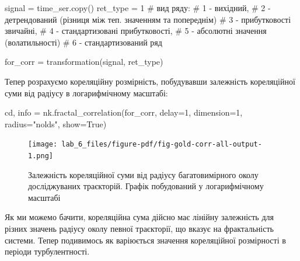 \documentclass[
  letterpaper,
]{report}
\newenvironment{Shaded}{\begin{snugshade}}{\end{snugshade}}
\newcommand{\CommentTok}[1]{\textcolor[rgb]{0.37,0.37,0.37}{#1}}
\newcommand{\DecValTok}[1]{\textcolor[rgb]{0.68,0.00,0.00}{#1}}
\newcommand{\NormalTok}[1]{\textcolor[rgb]{0.00,0.23,0.31}{#1}}
\newcommand{\OperatorTok}[1]{\textcolor[rgb]{0.37,0.37,0.37}{#1}}
\newcommand{\StringTok}[1]{\textcolor[rgb]{0.13,0.47,0.30}{#1}}
\newcommand{\VariableTok}[1]{\textcolor[rgb]{0.07,0.07,0.07}{#1}}
\begin{document}
\begin{Shaded}
\begin{Highlighting}[]
\NormalTok{signal }\OperatorTok{=}\NormalTok{ time\_ser.copy()}
\NormalTok{ret\_type }\OperatorTok{=} \DecValTok{1}    \CommentTok{\# вид ряду: }
                \CommentTok{\# 1 {-} вихідний, }
                \CommentTok{\# 2 {-} детрендований (різниця між теп. значенням та попереднім)}
                \CommentTok{\# 3 {-} прибутковості звичайні, }
                \CommentTok{\# 4 {-} стандартизовані прибутковості, }
                \CommentTok{\# 5 {-} абсолютні значення (волатильності)}
                \CommentTok{\# 6 {-} стандартизований ряд}

\NormalTok{for\_corr }\OperatorTok{=}\NormalTok{ transformation(signal, ret\_type) }
\end{Highlighting}
\end{Shaded}

Тепер розрахуємо кореляційну розмірність, побудувавши залежність
кореляційної суми від радіусу в логарифмічному масштабі:

\begin{Shaded}
\begin{Highlighting}[]
\NormalTok{cd, info }\OperatorTok{=}\NormalTok{ nk.fractal\_correlation(for\_corr,}
\NormalTok{                                  delay}\OperatorTok{=}\DecValTok{1}\NormalTok{, }
\NormalTok{                                  dimension}\OperatorTok{=}\DecValTok{1}\NormalTok{,}
\NormalTok{                                  radius}\OperatorTok{=}\StringTok{"nolds"}\NormalTok{, }
\NormalTok{                                  show}\OperatorTok{=}\VariableTok{True}\NormalTok{)}
\end{Highlighting}
\end{Shaded}

\begin{figure}[H]

{\centering \texttt{[image: lab\_6\_files/figure-pdf/fig-gold-corr-all-output-1.png]}

}

\caption{\label{fig-gold-corr-all}Залежність кореляційної суми від
радіусу багатовимірного околу досліджуваних траєкторій. Графік
побудований у логарифмічному масштабі}

\end{figure}

Як ми можемо бачити, кореляційна сума дійсно має лінійну залежність для
різних значень радіусу околу певної траєкторії, що вказує на
фрактальність системи. Тепер подивимось як варіюється значення
кореляційної розмірності в періоди турбулентності.
\end{document}
